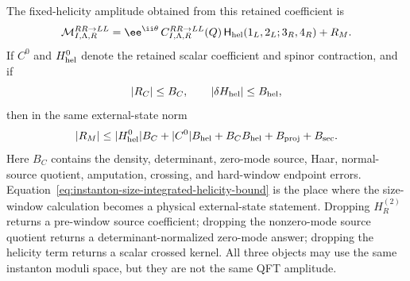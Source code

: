 \begin{controlledapproximation}
The fixed-helicity amplitude obtained from this retained coefficient is
\begin{equation}
  \mathcal M_{I,\Lambda,R}^{RR\to LL}
  =
  \ee^{\ii\theta}\,
  C_{I,\Lambda,R}^{RR\to LL}(Q)\,
  \mathsf H_{\rm hel}(1_L,2_L;3_R,4_R)
  +R_M .
  \label{eq:instanton-size-integrated-helicity-amplitude}
\end{equation}
If \(C^0\) and \(H_{\rm hel}^0\) denote the retained scalar coefficient and
spinor contraction, and if
\[
  |R_C|\le B_C,\qquad
  |\delta H_{\rm hel}|\le B_{\rm hel},
\]
then in the same external-state norm
\begin{equation}
  |R_M|
  \le
  |H_{\rm hel}^0|B_C
  +|C^0|B_{\rm hel}
  +B_CB_{\rm hel}
  +B_{\rm proj}+B_{\rm sec}.
  \label{eq:instanton-size-integrated-helicity-bound}
\end{equation}
Here \(B_C\) contains the density, determinant, zero-mode source, Haar,
normal-source quotient, amputation, crossing, and hard-window endpoint
errors.  Equation~\eqref{eq:instanton-size-integrated-helicity-bound} is the
place where the size-window calculation becomes a physical external-state
statement.  Dropping \(H_R^{(2)}\) returns a pre-window source coefficient;
dropping the nonzero-mode source quotient returns a determinant-normalized
zero-mode answer; dropping the helicity term returns a scalar crossed kernel.
All three objects may use the same instanton moduli space, but they are not
the same QFT amplitude.
\end{controlledapproximation}

